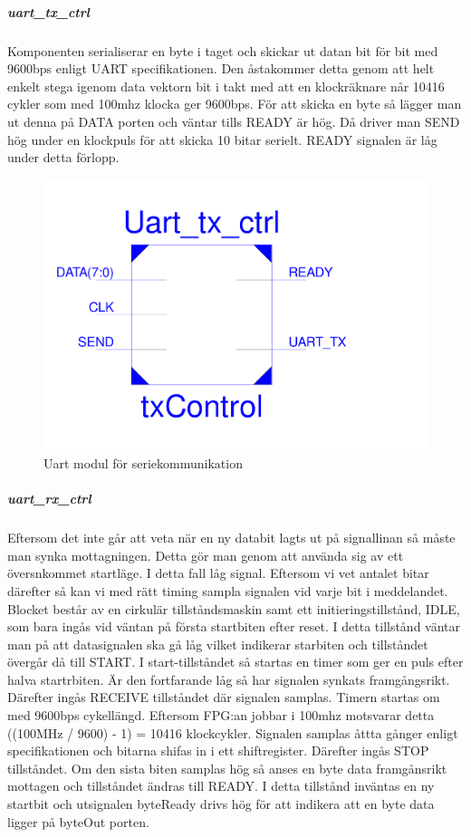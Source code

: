 \documentclass[a4paper]{scrartcl}
\begin{document}
		\subparagraph{uart\_tx\_ctrl}
		Komponenten serialiserar en byte i taget och skickar ut datan bit för bit med 9600bps enligt UART specifikationen. Den åstakommer detta genom att helt enkelt stega igenom data vektorn bit i takt med att en klockräknare når 10416 cykler som 			med 100mhz klocka ger 9600bps.
		För att skicka en byte så lägger man ut denna på DATA porten och väntar tills READY är hög. Då driver man SEND hög under en klockpuls för att skicka 10 bitar serielt. READY signalen är låg under detta förlopp. 

		\begin{figure}[H]
			\centering
			\includegraphics[scale=0.4]{txschematic.pdf}
			\caption{Uart modul för seriekommunikation}
		\end{figure}

		\subparagraph{uart\_rx\_ctrl}
		Eftersom det inte går att veta när en ny databit lagts ut på signallinan så måste man synka mottagningen. Detta gör man genom att använda sig av ett översnkommet startläge. I detta fall låg signal. Eftersom vi vet antalet bitar därefter så kan 		vi med rätt timing sampla signalen vid varje bit i meddelandet.
		Blocket består av en cirkulär tillståndsmaskin samt ett initieringstillstånd, IDLE, som bara ingås vid väntan på första startbiten efter reset. I detta tillstånd väntar man på att datasignalen ska gå låg vilket indikerar starbiten och tillståndet övergår 		då till START.
		I start-tillståndet så startas en timer som ger en puls efter halva startrbiten. Är den fortfarande låg så har signalen synkats framgångsrikt. Därefter ingås RECEIVE tillståndet där signalen samplas. Timern startas om med 9600bps cykellängd. 			Eftersom FPG:an jobbar i 100mhz motsvarar detta ((100MHz / 9600) - 1) = 10416 klockcykler. 
		Signalen samplas åttta gånger enligt specifikationen och bitarna shifas in i ett shiftregister. Därefter ingås STOP tillståndet. Om den sista biten samplas hög så anses en byte data framgånsrikt mottagen och tillståndet ändras till READY. I detta 			tillstånd inväntas en ny startbit och utsignalen byteReady drivs hög för att indikera att en byte data ligger på byteOut porten.
\end{document}

